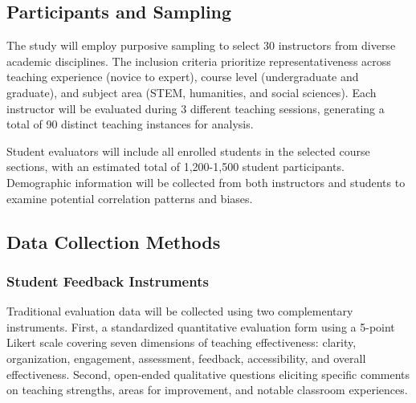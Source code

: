 \subsection{Participants and Sampling}
The study will employ purposive sampling to select 30 instructors from diverse academic disciplines. The inclusion criteria prioritize representativeness across teaching experience (novice to expert), course level (undergraduate and graduate), and subject area (STEM, humanities, and social sciences). Each instructor will be evaluated during 3 different teaching sessions, generating a total of 90 distinct teaching instances for analysis.


Student evaluators will include all enrolled students in the selected course sections, with an estimated total of 1,200-1,500 student participants. Demographic information will be collected from both instructors and students to examine potential correlation patterns and biases.

\subsection{Data Collection Methods}

\subsubsection{Student Feedback Instruments}
Traditional evaluation data will be collected using two complementary instruments. First, a standardized quantitative evaluation form using a 5-point Likert scale covering seven dimensions of teaching effectiveness: clarity, organization, engagement, assessment, feedback, accessibility, and overall effectiveness. Second, open-ended qualitative questions eliciting specific comments on teaching strengths, areas for improvement, and notable classroom experiences.

